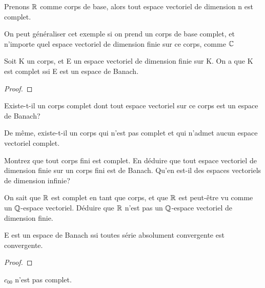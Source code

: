 Prenons $\mathbb{R}$ comme corps de base, alors tout espace vectoriel de dimension n
est complet.

On peut généraliser cet exemple si on prend un corps de base complet, et
n'importe quel espace vectoriel de dimension finie sur ce corps, comme $\mathbb{C}$

\begin{proposition}
	Soit K un corps, et E un espace vectoriel de dimension finie sur K. On a que
	K est complet ssi E est un espace de Banach.
\end{proposition}

\begin{proof}
	
\end{proof}

\begin{question}
	Existe-t-il un corps complet dont tout espace vectoriel sur ce corps est un
	espace de Banach?

	De même, existe-t-il un corps qui n'est pas complet et qui n'admet aucun
	espace vectoriel complet.
\end{question}

\begin{exercice}
	Montrez que tout corps fini est complet. En déduire que tout espace
	vectoriel de dimension finie sur un corps fini est de Banach. Qu'en est-il
	des espaces vectoriels de dimension infinie?
\end{exercice}

\begin{exercice}
	On sait que $\mathbb{R}$ est complet en tant que corps, et que $\mathbb{R}$ est
	peut-être vu comme un $\mathbb{Q}$-espace vectoriel. Déduire que $\mathbb{R}$
	n'est pas un $\mathbb{Q}$-espace vectoriel de dimension finie.
\end{exercice}

\begin{proposition}
	E est un espace de Banach ssi toutes série absolument convergente
	est convergente.
\end{proposition}

\begin{proof}
	
\end{proof}

\begin{exemple}
	$c_{00}$ n'est pas complet.
\end{exemple}

